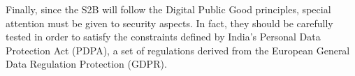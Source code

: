 Finally, since the S2B will follow the Digital Public Good principles, special attention must be given to security aspects. In fact, they should be carefully tested in order to satisfy the constraints defined by India’s Personal Data Protection Act (PDPA), a set of regulations derived from the European General Data Regulation Protection (GDPR).

